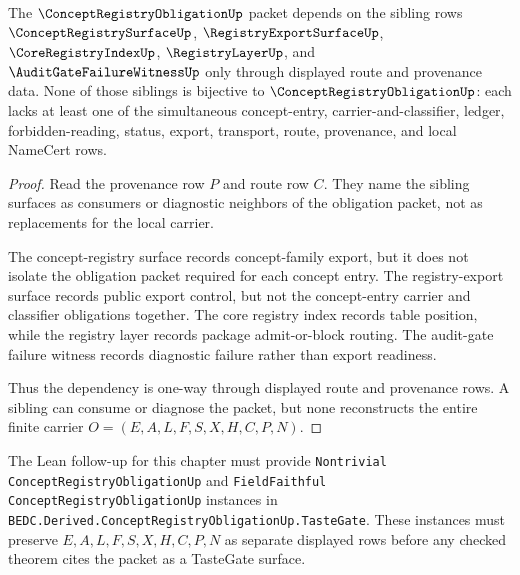\begin{theorem}
\label{thm:concept-registry-obligation-sibling-dependency}
The $\ConceptRegistryObligationUp$ packet depends on the sibling rows $\ConceptRegistrySurfaceUp$, $\RegistryExportSurfaceUp$, $\CoreRegistryIndexUp$, $\RegistryLayerUp$, and $\AuditGateFailureWitnessUp$ only through displayed route and provenance data. None of those siblings is bijective to $\ConceptRegistryObligationUp$: each lacks at least one of the simultaneous concept-entry, carrier-and-classifier, ledger, forbidden-reading, status, export, transport, route, provenance, and local NameCert rows.
\end{theorem}
\begin{proof}
Read the provenance row $P$ and route row $C$. They name the sibling surfaces as consumers or diagnostic neighbors of the obligation packet, not as replacements for the local carrier.

The concept-registry surface records concept-family export, but it does not isolate the obligation packet required for each concept entry. The registry-export surface records public export control, but not the concept-entry carrier and classifier obligations together. The core registry index records table position, while the registry layer records package admit-or-block routing. The audit-gate failure witness records diagnostic failure rather than export readiness.

Thus the dependency is one-way through displayed route and provenance rows. A sibling can consume or diagnose the packet, but none reconstructs the entire finite carrier $O=(E,A,L,F,S,X,H,C,P,N)$.
\end{proof}



The Lean follow-up for this chapter must provide \texttt{Nontrivial ConceptRegistryObligationUp} and \texttt{FieldFaithful ConceptRegistryObligationUp} instances in \texttt{BEDC.Derived.ConceptRegistryObligationUp.TasteGate}. These instances must preserve $E,A,L,F,S,X,H,C,P,N$ as separate displayed rows before any checked theorem cites the packet as a TasteGate surface.

